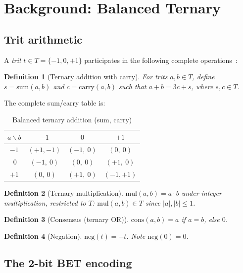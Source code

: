 \documentclass[journal,10pt,twocolumn]{IEEEtran}
\newtheorem{definition}{Definition}
\begin{document}
\section{Background: Balanced Ternary}
\label{sec:background}

\subsection{Trit arithmetic}

A \emph{trit} $t \in T = \{-1, 0, +1\}$ participates in the following
complete operations~\cite{knuth1997art}:

\begin{definition}[Ternary addition with carry]
For trits $a, b \in T$, define $s = \mathrm{sum}(a,b)$ and
$c = \mathrm{carry}(a,b)$ such that $a + b = 3c + s$, where
$s, c \in T$.
\end{definition}

The complete sum/carry table is:

\begin{table}[h]
\centering
\small
\caption{Balanced ternary addition (sum, carry)}
\label{tab:add}
\begin{tabular}{c|ccc}
\toprule
$a \backslash b$ & $-1$ & $0$ & $+1$ \\
\midrule
$-1$ & $(+1,-1)$ & $(-1,\ 0)$ & $(0,\ 0)$ \\
$\ 0$ & $(-1,\ 0)$ & $(0,\ 0)$ & $(+1,\ 0)$ \\
$+1$ & $(0,\ 0)$ & $(+1,\ 0)$ & $(-1,+1)$ \\
\bottomrule
\end{tabular}
\end{table}

\begin{definition}[Ternary multiplication]
$\mathrm{mul}(a,b) = a \cdot b$ under integer multiplication,
restricted to $T$: $\mathrm{mul}(a,b) \in T$ since $|a|,|b| \leq 1$.
\end{definition}

\begin{definition}[Consensus (ternary OR)]
$\mathrm{cons}(a,b) = a$ if $a = b$, else $0$.
\end{definition}

\begin{definition}[Negation]
$\mathrm{neg}(t) = -t$. Note $\mathrm{neg}(0) = 0$.
\end{definition}

\subsection{The 2-bit BET encoding}
\end{document}
